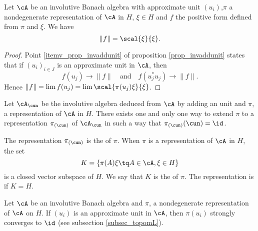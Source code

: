 \begin{proposition}
Let $\cA$ be an involutive Banach algebra with approximate unit $(u_i)$,$\pi$ a nondegenerate representation of $\cA$ in $H$, $\xi\in H$ and $f$ the positive form defined from $\pi$ and $\xi$. We have
\begin{equation}
\| f \|=\scal{ \xi }{ \xi }.
\end{equation}
\end{proposition}

\begin{proof}
Point \ref{itemv_prop_invaddunit} of proposition  \ref{prop_invaddunit} states that if $(u_i)_{i\in J}$ is an approximate unit in $\cA$, then 
\[ 
  f(u_j)\to\| f \|\quad\text{and}\quad f(u_j^*u_j)\to \| f \|.
\]
Hence $\| f \|=\lim f(u_j)=\lim\scal{ \pi(u_j)\xi }{ \xi }$.

\end{proof}

\begin{proposition}
Let $\cA_{\cun}$ be the involutive algebra deduced from $\cA$ by adding an unit and $\pi$, a representation of $\cA$ in $H$. There exists one and only one way to extend $\pi$ to a representation $\pi_{(\cun)}$ of $\cA_{\cun}$ in such a way that $\pi_{(\cun)}(\cun)=\id$.
\end{proposition}
The representation $\pi_{(\cun)}$ is the  of $\pi$. When $\pi$ is a representation of $\cA$ in $H$, the set
\begin{equation}
 K=\{ \pi(A)\xi\tq A\in\cA,\xi\in H \}
\end{equation}
is a closed vector subspace of $H$. We say that $K$ is the  of $\pi$. The representation is  if $K=H$.

\begin{proposition}
Let $\cA$ be an involutive Banach algebra and $\pi$, a nondegenerate representation of $\cA$ on $H$. If $(u_i)$ is an approximate unit in $\cA$, then $\pi(u_i)$ strongly converges to $\id$ (see subsection \ref{subsec_topomL}). 
\end{proposition}

